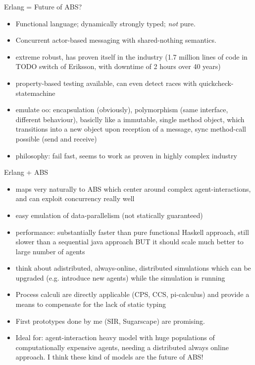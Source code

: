 \documentclass{beamer} %
\begin{document}
\begin{frame}{Erlang = Future of ABS?}
  \begin{itemize}
    \item Functional language; dynamically strongly typed; \textit{not} pure.
    \item Concurrent actor-based messaging with shared-nothing semantics.
    \item extreme robust, has proven itself in the industry (1.7 million lines of code in TODO switch of Eriksson, with downtime of 2 hours over 40 years)
    \item property-based testing available, can even detect races with quickcheck-statemachine
    \item emulate oo: encapsulation (obviously), polymorphism (same interface, different behaviour), basiclly like a immutable, single method object, which transitions into a new object upon reception of a message, sync method-call possible (send and receive)
    \item philosophy: fail fast, seems to work as proven in highly complex industry 
  \end{itemize}
\end{frame}

\begin{frame}{Erlang + ABS}
  \begin{itemize}
    \item maps very naturally to ABS which center around complex agent-interactions, and can exploit concurrency really well
    \item easy emulation of data-parallelism (not statically guaranteed)
    \item performance: substantially faster than pure functional Haskell approach, still slower than a sequential java approach BUT it should scale much better to large number of agents 
    \item think about adistributed, always-online, distributed simulations which can be upgraded (e.g. introduce new agents) while the simulation is running
    \item Process calculi are directly applicable (CPS, CCS, pi-calculus) and provide a means to compensate for the lack of static typing
    \item First prototypes done by me (SIR, Sugarscape) are promising.
    \item Ideal for: agent-interaction heavy model with huge populations of computationally expensive agents, needing a distributed always online approach. I think these kind of models are the future of ABS!
  \end{itemize}
\end{frame}
\end{document}
